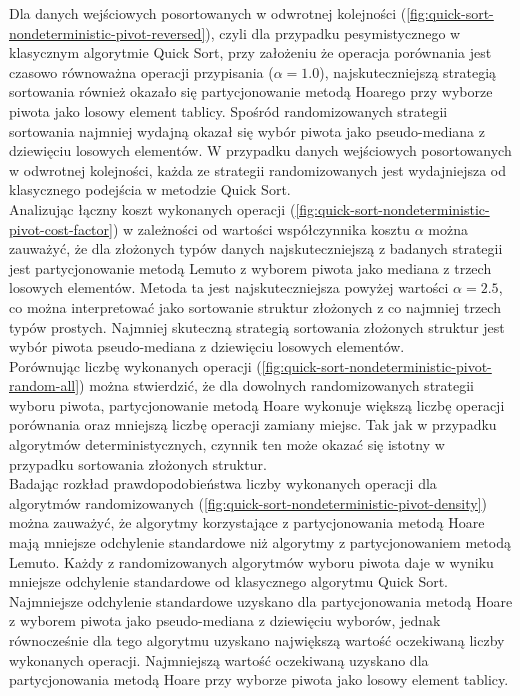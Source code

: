 Dla danych wejściowych posortowanych w odwrotnej kolejności (\ref{fig:quick-sort-nondeterministic-pivot-reversed}), czyli dla przypadku pesymistycznego w klasycznym algorytmie Quick Sort, przy założeniu że operacja porównania jest czasowo równoważna operacji przypisania ($\alpha=1.0$), najskuteczniejszą strategią sortowania również okazało się partycjonowanie metodą Hoarego przy wyborze piwota jako losowy element tablicy. Spośród randomizowanych strategii sortowania najmniej wydajną okazał się wybór piwota jako pseudo-mediana z dziewięciu losowych elementów. W przypadku danych wejściowych posortowanych w odwrotnej kolejności, każda ze strategii randomizowanych jest wydajniejsza od klasycznego podejścia w metodzie Quick Sort.\\

Analizując łączny koszt wykonanych operacji (\ref{fig:quick-sort-nondeterministic-pivot-cost-factor}) w zależności od wartości współczynnika kosztu $\alpha$ można zauważyć, że dla złożonych typów danych najskuteczniejszą z badanych strategii jest partycjonowanie metodą Lemuto z wyborem piwota jako mediana z trzech losowych elementów. Metoda ta jest najskuteczniejsza powyżej wartości $\alpha = 2.5$, co można interpretować jako sortowanie struktur złożonych z co najmniej trzech typów prostych. Najmniej skuteczną strategią sortowania złożonych struktur jest wybór piwota pseudo-mediana z dziewięciu losowych elementów.\\

Porównując liczbę wykonanych operacji (\ref{fig:quick-sort-nondeterministic-pivot-random-all}) można stwierdzić, że dla dowolnych randomizowanych strategii wyboru piwota, partycjonowanie metodą Hoare wykonuje większą liczbę operacji porównania oraz mniejszą liczbę operacji zamiany miejsc. Tak jak w przypadku algorytmów deterministycznych, czynnik ten może okazać się istotny w przypadku sortowania złożonych struktur.\\

Badając rozkład prawdopodobieństwa liczby wykonanych operacji dla algorytmów randomizowanych (\ref{fig:quick-sort-nondeterministic-pivot-density}) można zauważyć, że algorytmy korzystające z partycjonowania metodą Hoare mają mniejsze odchylenie standardowe niż algorytmy z partycjonowaniem metodą Lemuto. Każdy z randomizowanych algorytmów wyboru piwota daje w wyniku mniejsze odchylenie standardowe od klasycznego algorytmu Quick Sort. Najmniejsze odchylenie standardowe uzyskano dla partycjonowania metodą Hoare z wyborem piwota jako pseudo-mediana z dziewięciu wyborów, jednak równocześnie dla tego algorytmu uzyskano największą wartość oczekiwaną liczby wykonanych operacji. Najmniejszą wartość oczekiwaną uzyskano dla partycjonowania metodą Hoare przy wyborze piwota jako losowy element tablicy.


